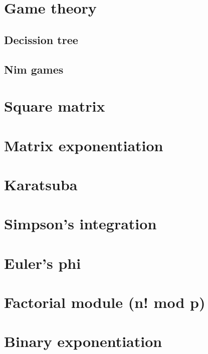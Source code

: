 	\section{Game theory}
		\subsection{Decission tree}
		\subsection{Nim games}
	\section{Square matrix}
	\section{Matrix exponentiation}
	\section{Karatsuba}
	\section{Simpson's integration}
	\section{Euler's phi}
	\section{Factorial module (n! mod p)}
	\section{Binary exponentiation}
